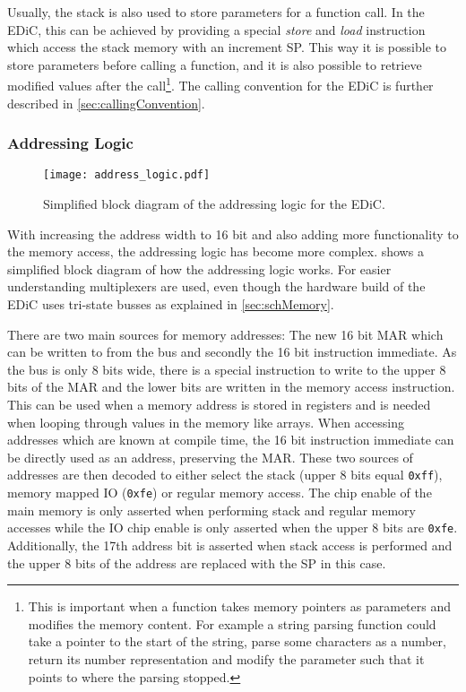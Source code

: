 Usually, the stack is also used to store parameters for a function call.
In the \gls{EDiC}, this can be achieved by providing a special \emph{store} and \emph{load} instruction which access the stack memory with an increment \gls{SP}.
This way it is possible to store parameters before calling a function, and it is also possible to retrieve modified values after the call\footnote{This is important when a function takes memory pointers as parameters and modifies the memory content. For example a string parsing function could take a pointer to the start of the string, parse some characters as a number, return its number representation and modify the parameter such that it points to where the parsing stopped.}.
The calling convention for the \gls{EDiC} is further described in \cref{sec:callingConvention}.

\subsubsection{Addressing Logic}\label{sec:addrLogic}
\begin{figure}[t]
  \centering
  \texttt{[image: address\_logic.pdf]}
  \caption{Simplified block diagram of the addressing logic for the \gls{EDiC}.}
  \label{fig:addressLogic}
\end{figure}
With increasing the address width to 16 bit and also adding more functionality to the memory access, the addressing logic has become more complex.
 shows a simplified block diagram of how the addressing logic works.
For easier understanding multiplexers are used, even though the hardware build of the \gls{EDiC} uses tri-state busses as explained in \cref{sec:schMemory}.

There are two main sources for memory addresses: The new 16 bit \gls{MAR} which can be written to from the bus and secondly the 16 bit instruction immediate.
As the bus is only 8 bits wide, there is a special instruction to write to the upper 8 bits of the \gls{MAR} and the lower bits are written in the memory access instruction.
This can be used when a memory address is stored in registers and is needed when looping through values in the memory like arrays.
When accessing addresses which are known at compile time, the 16 bit instruction immediate can be directly used as an address, preserving the \gls{MAR}.
These two sources of addresses are then decoded to either select the stack (upper 8 bits equal \texttt{0xff}), memory mapped \gls{IO} (\texttt{0xfe}) or regular memory access.
The chip enable of the main memory is only asserted when performing stack and regular memory accesses while the \gls{IO} chip enable is only asserted when the upper 8 bits are \texttt{0xfe}.
Additionally, the 17th address bit is asserted when stack access is performed and the upper 8 bits of the address are replaced with the \gls{SP} in this case.

